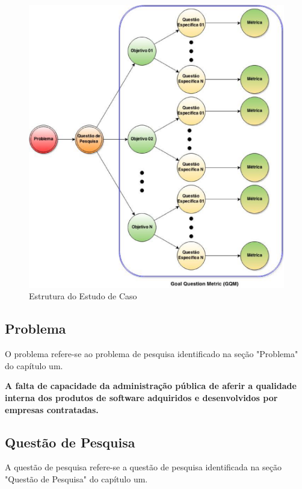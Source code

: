 \begin{figure}[h!]
\centering
\includegraphics[keepaspectratio=false,scale=0.5]{figuras/figuras_nilton/EstruturaEstudoCaso.eps}
\caption{Estrutura do Estudo de Caso}
\label{EstruturaEstudoCaso}
\end{figure}


\subsection{Problema}

O problema refere-se ao problema de pesquisa identificado na seção "Problema" do capítulo um.

\textbf{A falta de capacidade da administração pública de aferir a qualidade interna dos produtos de software adquiridos e desenvolvidos por empresas contratadas.}

\subsection{Questão de Pesquisa}

A questão de pesquisa refere-se a questão de pesquisa identificada na seção "Questão de Pesquisa" do capítulo um. 

